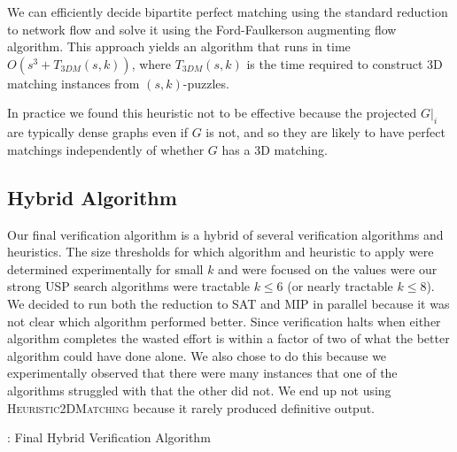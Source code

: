 \documentclass[11pt]{article}
\begin{document}
We can efficiently decide bipartite perfect matching using the
standard reduction to network flow and solve it using the
Ford-Faulkerson augmenting flow algorithm.  This approach yields an
algorithm that runs in time $O(s^3 + T_{3DM}(s,k))$, where
$T_{3DM}(s,k)$ is the time required to construct 3D matching instances
from $(s,k)$-puzzles.

In practice we found this heuristic not to be effective because the
projected $G|_i$ are typically dense graphs even if $G$ is not, and so
they are likely to have perfect matchings independently of whether $G$
has a 3D matching.



\subsection{Hybrid Algorithm}

Our final verification algorithm is a hybrid of several verification
algorithms and heuristics.  The size thresholds for which algorithm
and heuristic to apply were determined experimentally for small $k$
and were focused on the values were our strong USP search algorithms
were tractable $k \le 6$ (or nearly tractable $k \le 8$).  We decided
to run both the reduction to SAT and MIP in parallel because it was
not clear which algorithm performed better.  Since verification halts
when either algorithm completes the wasted effort is within a factor
of two of what the better algorithm could have done alone.  We also
chose to do this because we experimentally observed that there were
many instances that one of the algorithms struggled with that the
other did not.  We end up not using \textsc{Heuristic2DMatching}
because it rarely produced definitive output.

\begin{algorithm}
  \caption{: Final Hybrid Verification Algorithm}
  \label{alg:hybrid}
\begin{algorithmic}[1]
    \EndIf
    \EndIf
    \EndIf
  \EndFunction
\end{algorithmic}
\end{algorithm}
\end{document}
